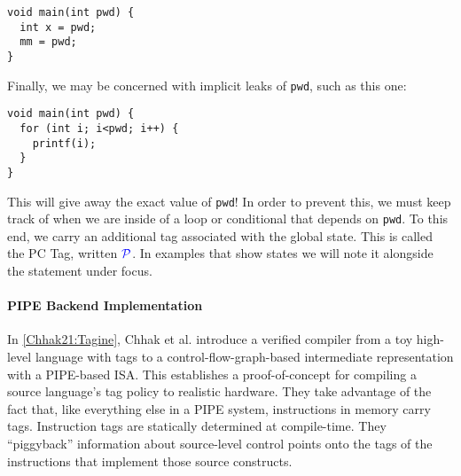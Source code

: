 \documentclass{llncs}
\begin{document}
\begin{verbatim}
void main(int pwd) {
  int x = pwd;
  mm = pwd;
}
\end{verbatim}

Finally, we may be concerned with implicit leaks of {\tt pwd}, such as this one:
\begin{verbatim}
void main(int pwd) {
  for (int i; i<pwd; i++) {
    printf(i);
  }
}
\end{verbatim}

This will give away the exact value of {\tt pwd}! In order to prevent this, we must keep track of
when we are inside of a loop or conditional that depends on {\tt pwd}.
To this end, we carry an additional tag associated with the global state. This is called the PC Tag,
written \(\mathcal{\color{blue} P}\). In examples that show states we will note it alongside the statement under focus.

\paragraph{PIPE Backend Implementation}

In \cref{Chhak21:Tagine}, Chhak et al. introduce a verified compiler from a toy
high-level language with tags
to a control-flow-graph-based intermediate representation with a PIPE-based
ISA.  This establishes a proof-of-concept for compiling a source language's tag policy to
realistic hardware. They take advantage of the fact that, like everything else in a PIPE system,
instructions in memory carry tags. Instruction tags are statically determined at compile-time.
They ``piggyback'' information about source-level control points onto the tags of the instructions
that implement those source constructs.
\end{document}
